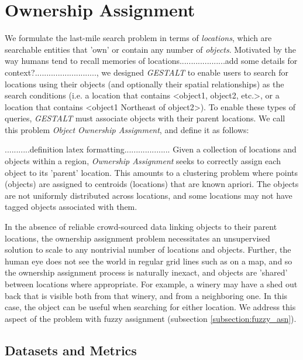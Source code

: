 \section{Ownership Assignment}
\label{section:ownership}


We formulate the last-mile search problem in terms of \textit{locations}, which are searchable entities that 'own' or contain any number of \textit{objects}. Motivated by the way humans tend to recall memories of locations....................add some details for context?..........................., we designed \emph{GESTALT} to enable users to search for locations using their objects (and optionally their spatial relationships) as the search conditions (i.e. a location that contains <object1, object2, etc.>, or a location that contains <object1 Northeast of object2>). To enable these types of queries, \emph{GESTALT} must associate objects with their parent locations.
We call this problem \textit{Object Ownership Assignment}, and define it as follows:

...........definition latex formatting.................... Given a collection of locations and objects within a region, \emph{Ownership Assignment} seeks to correctly assign each object to its 'parent' location. This amounts to a clustering problem where points (objects) are assigned to centroids (locations) that are known apriori. The objects are not uniformly distributed across locations, and some locations may not have tagged objects associated with them. 


In the absence of reliable crowd-sourced data linking objects to their parent locations, the ownership assignment problem necessitates an unsupervised solution to scale to any nontrivial number of locations and objects. Further, the human eye does not see the world in regular grid lines such as on a map, and so the ownership assignment process is naturally inexact, and objects are 'shared' between locations where appropriate. For example, a winery may have a shed out back that is visible both from that winery, and from a neighboring one. In this case, the object can be useful when searching for either location. We address this aspect of the problem with fuzzy assignment (subsection \ref{subsection:fuzzy_asn}).


\subsection{Datasets and Metrics}

